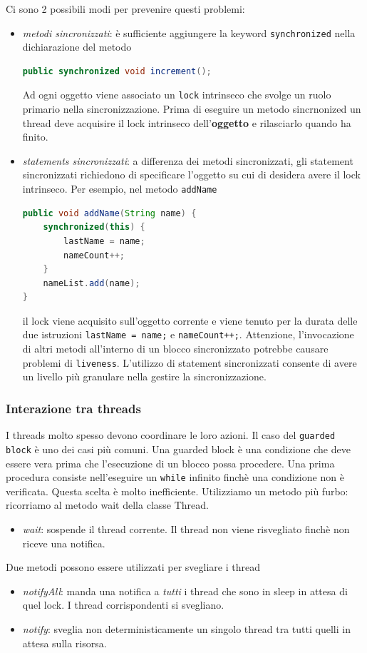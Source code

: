 \documentclass{article}
\begin{document}
Ci sono 2 possibili modi per prevenire questi problemi:
\begin{itemize}
\item \emph{metodi sincronizzati}: \`e sufficiente aggiungere la keyword \texttt{synchronized} nella dichiarazione del metodo
\begin{lstlisting}[language=Java]
public synchronized void increment();
\end{lstlisting}
Ad ogni oggetto viene associato un \texttt{lock} intrinseco che svolge un ruolo primario nella sincronizzazione. Prima di eseguire un metodo sincrnonized un thread deve acquisire il lock intrinseco dell'\textbf{oggetto} e rilasciarlo quando ha finito.
\item \emph{statements sincronizzati}: a differenza dei metodi sincronizzati, gli statement sincronizzati richiedono di specificare l'oggetto su cui di desidera avere il lock intrinseco. Per esempio, nel metodo \texttt{addName}
\begin{lstlisting}[language=Java]
public void addName(String name) {
    synchronized(this) {
        lastName = name;
        nameCount++;
    }
    nameList.add(name);
}
\end{lstlisting}
il lock viene acquisito sull'oggetto corrente e viene tenuto per la durata delle due istruzioni \texttt{lastName = name;} e \texttt{nameCount++;}. Attenzione, l'invocazione di altri metodi all'interno di un blocco sincronizzato potrebbe causare problemi di \texttt{liveness}. L'utilizzo di statement sincronizzati consente di avere un livello pi\`u granulare nella gestire la sincronizzazione.
\end{itemize}


\subsubsection{Interazione tra threads}
I threads molto spesso devono coordinare le loro azioni. Il caso del \texttt{guarded block} \`e uno dei casi pi\`u comuni. Una guarded block \`e una condizione che deve essere vera prima che l'esecuzione di un blocco possa procedere. Una prima procedura consiste nell'eseguire un \texttt{while} infinito finch\`e una condizione non \`e verificata. Questa scelta \`e molto inefficiente. Utilizziamo un metodo pi\`u furbo: ricorriamo al metodo wait della classe Thread.
\begin{itemize}
\item \emph{wait}: sospende il thread corrente. Il thread non viene risvegliato finch\`e non riceve una notifica.
\end{itemize}
Due metodi possono essere utilizzati per svegliare i thread
\begin{itemize}
\item \emph{notifyAll}: manda una notifica a \emph{tutti} i thread che sono in sleep in attesa di quel lock. I thread corrispondenti si svegliano.
\item \emph{notify}: sveglia non deterministicamente un singolo thread tra tutti quelli in attesa sulla risorsa.
\end{itemize}
\end{document}
